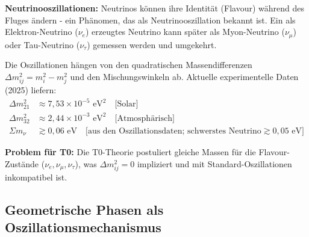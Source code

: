 	\begin{warning}
		\textbf{Neutrinooszillationen:} Neutrinos können ihre Identität (Flavour) während des Fluges ändern - ein Phänomen, das als Neutrinooszillation bekannt ist. Ein als Elektron-Neutrino ($\nu_e$) erzeugtes Neutrino kann später als Myon-Neutrino ($\nu_\mu$) oder Tau-Neutrino ($\nu_\tau$) gemessen werden und umgekehrt.
		
		Die Oszillationen hängen von den quadratischen Massendifferenzen $\Delta m^2_{ij} = m_i^2 - m_j^2$ und den Mischungswinkeln ab. Aktuelle experimentelle Daten (2025) liefern:
		\begin{align}
			\Delta m^2_{21} &\approx 7,53 \times 10^{-5} \text{ eV}^2 \quad \text{[Solar]} \\
			\Delta m^2_{32} &\approx 2,44 \times 10^{-3} \text{ eV}^2 \quad \text{[Atmosphärisch]} \\
			\Sigma m_\nu &\gtrsim 0,06 \text{ eV} \quad \text{[aus den Oszillationsdaten; schwerstes Neutrino} \gtrsim 0,05 \text{ eV]}
		\end{align}
		
		\textbf{Problem für T0:}
		Die T0-Theorie postuliert gleiche Massen für die Flavour-Zustände ($\nu_e, \nu_\mu, \nu_\tau$), was $\Delta m^2_{ij} = 0$ impliziert und mit Standard-Oszillationen inkompatibel ist.
	\end{warning}
	
	\subsection{Geometrische Phasen als Oszillationsmechanismus}
	
